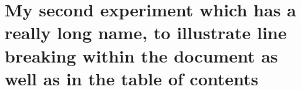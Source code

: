 \chapter{My second experiment \dash which has a really long name, to
illustrate line breaking within the document as well as in the table of
contents}

